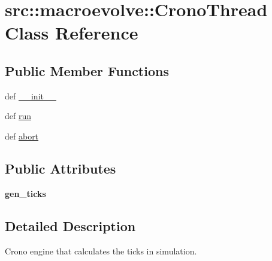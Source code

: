\hypertarget{classsrc_1_1macroevolve_1_1CronoThread}{
\section{src::macroevolve::CronoThread Class Reference}
\label{classsrc_1_1macroevolve_1_1CronoThread}
}
\subsection*{Public Member Functions}
\begin{DoxyCompactItemize}
\item 
def \hyperlink{classsrc_1_1macroevolve_1_1CronoThread_a4286a5355494d892c3331e58fdd1aff3}{\_\-\_\-init\_\-\_\-}
\item 
def \hyperlink{classsrc_1_1macroevolve_1_1CronoThread_ac0c116aafadea0ae37457e2e6b8490d3}{run}
\item 
def \hyperlink{classsrc_1_1macroevolve_1_1CronoThread_a954c953fdf8e51533b5c87ccdbe28dd9}{abort}
\end{DoxyCompactItemize}
\subsection*{Public Attributes}
\begin{DoxyCompactItemize}
\item 
\hypertarget{classsrc_1_1macroevolve_1_1CronoThread_a2b185e8641b5fc7628173922718a64f4}{
{\bfseries gen\_\-ticks}}
\label{classsrc_1_1macroevolve_1_1CronoThread_a2b185e8641b5fc7628173922718a64f4}

\end{DoxyCompactItemize}


\subsection{Detailed Description}
\begin{DoxyVerb}Crono engine that calculates the ticks in simulation.\end{DoxyVerb}
 

